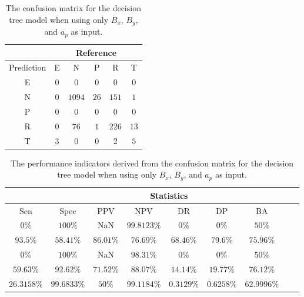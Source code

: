 \begin{table}[!ht]
	\centering
	\begin{tabular}{|c|c|c|c|c|c|}
		\hline
		 & \multicolumn{5}{|c|}{Reference} \\ \hline
		 Prediction & E & N & P & R & T \\ \hline
		 E & $0$ & $0$ & $0$ & $0$ & $0$ \\ \hline
		 N & $0$ & $1094$ & $26$ & $151$ & $1$ \\ \hline
		 P & $0$ & $0$ & $0$ & $0$ & $0$ \\ \hline
		 R & $0$ & $76$ & $1$ & $226$ & $13$ \\ \hline
		 T & $3$ & $0$ & $0$ & $2$ & $5$ \\ \hline
	\end{tabular}
	\caption{The confusion matrix for the decision tree model when using only $B_{x}$, $B_{y}$, and $a_{p}$ as input.}
	\label{tab:cm:xyap:C5.0}
\end{table}

\begin{table}[!ht]
	\centering
	\begin{tabular}{|c|c|c|c|c|c|c|c|c|}
		\hline
		 & \multicolumn{7}{c|}{Statistics} \\ \hline
		Sen & Spec & PPV & NPV & DR & DP & BA \\ \hline
		$0\%$ & $100\%$ & NaN & $99.8123\%$ & $0\%$ & $0\%$ & $50\%$ \\ \hline
		$93.5\%$ & $58.41\%$ & $86.01\%$ & $76.69\%$ & $68.46\%$ & $79.6\%$ & $75.96\%$ \\ \hline
		$0\%$ & $100\%$ & NaN & $98.31\%$ & $0\%$ & $0\%$ & $50\%$ \\ \hline
		$59.63\%$ & $92.62\%$ & $71.52\%$ & $88.07\%$ & $14.14\%$ & $19.77\%$ & $76.12\%$ \\ \hline
		$26.3158\%$ & $99.6833\%$ & $50\%$ & $99.1184\%$ & $0.3129\%$ & $0.6258\%$ & $62.9996\%$ \\ \hline
	\end{tabular}
	\caption{The performance indicators derived from the confusion matrix for the decision tree model when using only $B_{x}$, $B_{y}$, and $a_{p}$ as input.}
	\label{tab:cs:xyap:C5.0}
\end{table}


